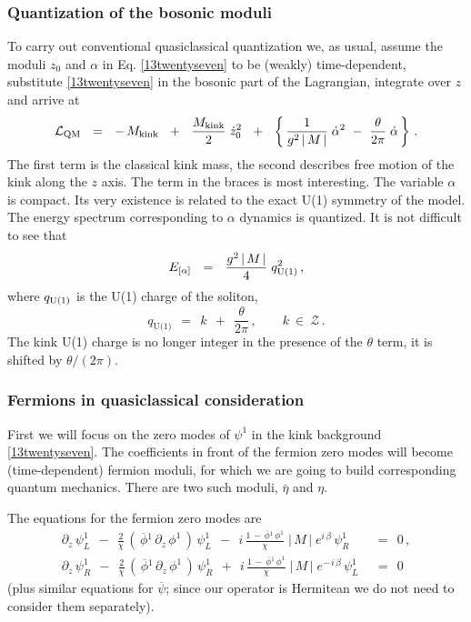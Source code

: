 \documentclass[epsfig,12pt]{article}
\def\beq{\begin{equation}}
\def\eeq{\end{equation}}
\def\beq{\begin{equation}}
\def\eeq{\end{equation}}
\newcommand{\p}{\partial}
\newcommand{\ov}{\overline}
\newcommand{\mc}[1]{\mathcal{#1}}
\newcommand{\bpsi}{\ov{\psi}{}}
\newcommand{\bphi}{\ov{\phi}{}}
\begin{document}
\subsubsection{Quantization of the bosonic moduli}

	To carry out  conventional
	quasiclassical quantization we, as usual,
	assume the moduli $ z_0 $ and $ \alpha $ in Eq. \eqref{13twentyseven}
	to be (weakly) time-dependent, substitute  \eqref{13twentyseven}
	in the bosonic part of the Lagrangian, integrate over $ z $
	and arrive at
\beq
{\cal L}_{\rm QM}  ~~=~~  -\,M_{\rm kink}  ~~+~~  \frac{M_{\rm kink}}{2}\; \dot z_0^2 ~~+~~  
			\left\{\,
				\frac{1}{g^2\,|\, M \,|}\; \dot\alpha^2  ~-~
				\frac{\theta}{2\pi}\;\dot\alpha
			\,\right\}\,.
\label{13twentynine}
\eeq
	The first term is the classical kink mass, the second describes
	free motion of the kink along the $z$ axis.
	The term in the braces is most interesting.
	The variable $ \alpha $ is compact.
	Its very existence is related to the exact U(1) symmetry of the model.
	The energy spectrum corresponding
	to $ \alpha $ dynamics is quantized.
	It is not difficult to see that
\beq
E_{[\alpha ]}  ~~=~~ \frac{g^2\, |\, M \,|}{4}\; q_{\rm U(1)}^2\,,
\label{13thirty}
\eeq
	where 
$ q_{\rm U(1)} $ 
	is the U(1) charge of the soliton,
\beq
	q_\text{U(1)} ~~=~~ k ~~+~~ \frac{\theta}{2\pi}\,,\qquad k ~\in~ \mc{Z}\,.
\label{13thirtyone}
\eeq
	The kink U(1) charge is no longer integer
	in the presence of the $\theta$ term, it is shifted by $\theta/(2\pi )$.


\subsubsection{Fermions in quasiclassical consideration}

	First we will  focus on the 
	zero modes of $\psi^1$ in the kink background \eqref{13twentyseven}.
	The coefficients
	in front of the fermion zero modes will become (time-dependent)
	 fermion moduli, for which we are going to build
	corresponding quantum mechanics. 
	There are two such moduli, $\bar\eta$ and $\eta$.

	The equations for the fermion zero modes are
\begin{align}
	\p_z\,\psi_L^1  ~~-~~  
	\frac{2}{\chi}\, 
	\left(\, \bphi^1\, \p_z\, \phi^1 \,\right) \,\psi_L^1  ~~-~~
	i\,\frac{1 \,-\, \bphi^1\, \phi^1}{\chi}\; |\, M \,|\; e^{i\, \beta} \,\psi_R^1
	&  ~~=~~  0\,,
\nonumber
	\\[3mm]
	\p_z\,\psi_R^1  ~~-~~  
	\frac{2}{\chi}\, 
	\left(\, \bphi^1\, \p_z\, \phi^1 \,\right) \,\psi_R^1  ~~+~~  
	i\,\frac{1 \,-\, \bphi^1\, \phi^1}{\chi}\; |\, M \,|\; e^{-\, i\, \beta} \,\psi_L^1
	&  ~~=~~  0
\label{13fourtyfour}
\end{align}
	(plus similar equations for $\bpsi$; since our operator is 
	Hermitean we do not need to consider them separately).
\end{document}
